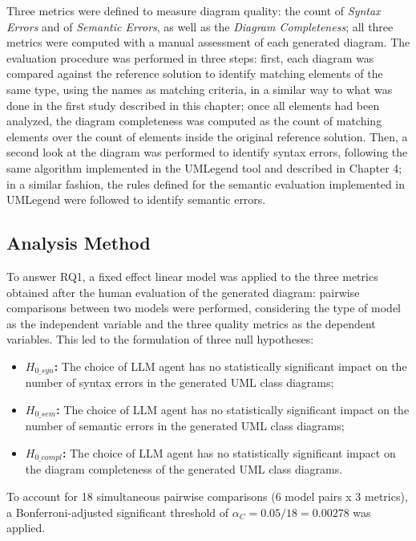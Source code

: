 Three metrics were defined to measure diagram quality: the count of \textit{Syntax Errors} and of \textit{Semantic Errors}, as well as the \textit{Diagram Completeness}; all three metrics were computed with a manual assessment of each generated diagram. The evaluation procedure was performed in three steps: first, each diagram was compared against the reference solution to identify matching elements of the same type, using the names as matching criteria, in a similar way to what was done in the first study described in this chapter; once all elements had been analyzed, the diagram completeness was computed as the count of matching elements over the count of elements inside the original reference solution. Then, a second look at the diagram was performed to identify syntax errors, following the same algorithm implemented in the UMLegend tool and described in Chapter 4; in a similar fashion, the rules defined for the semantic evaluation implemented in UMLegend were followed to identify semantic errors.

\subsection{Analysis Method}

To answer RQ1, a fixed effect linear model was applied to the three metrics obtained after the human evaluation of the generated diagram: pairwise comparisons between two models were performed, considering the type of model as the independent variable and the three quality metrics as the dependent variables. This led to the formulation of three null hypotheses:

\begin{itemize}
    \item \textbf{${H_{0\_{syn}}}$:} The choice of LLM agent has no statistically significant impact on the number of syntax errors in the generated UML class diagrams;
    \item \textbf{${H_{0\_{sem}}}$:} The choice of LLM agent has no statistically significant impact on the number of semantic errors in the generated UML class diagrams;
    \item \textbf{${H_{0\_{compl}}}$:} The choice of LLM agent has no statistically significant impact on the diagram completeness of the generated UML class diagrams.
\end{itemize}

To account for 18 simultaneous pairwise comparisons (6 model pairs x 3 metrics), a Bonferroni-adjusted significant threshold of $\alpha_C = 0.05/18 = 0.00278$ was applied.

